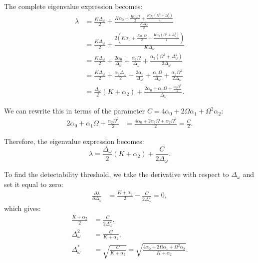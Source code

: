 \documentclass[a4paper,pre,superscriptaddress,floatfix,nofootinbib,twocolumn]{revtex4-1}
\begin{document}
The complete eigenvalue expression becomes:
\begin{align*}
\lambda &= \frac{K\Delta_\omega}{2} + \frac{K\alpha_0 + \frac{K\alpha_1 \Omega}{2} + \frac{K\alpha_2(\Omega^2 + \Delta_\omega^2)}{4}}{\frac{K\Delta_\omega}{2}}\\
&= \frac{K\Delta_\omega}{2} + \frac{2\left(K\alpha_0 + \frac{K\alpha_1 \Omega}{2} + \frac{K\alpha_2(\Omega^2 + \Delta_\omega^2)}{4}\right)}{K\Delta_\omega}\\
&= \frac{K\Delta_\omega}{2} + \frac{2\alpha_0}{\Delta_\omega} + \frac{\alpha_1 \Omega}{\Delta_\omega} + \frac{\alpha_2(\Omega^2 + \Delta_\omega^2)}{2\Delta_\omega}\\
&= \frac{K\Delta_\omega}{2} + \frac{\alpha_2\Delta_\omega}{2} + \frac{2\alpha_0}{\Delta_\omega} + \frac{\alpha_1 \Omega}{\Delta_\omega} + \frac{\alpha_2\Omega^2}{2\Delta_\omega}\\
&= \frac{\Delta_\omega}{2}(K + \alpha_2) + \frac{2\alpha_0 + \alpha_1 \Omega + \frac{\alpha_2\Omega^2}{2}}{\Delta_\omega}.
\end{align*}

We can rewrite this in terms of the parameter $C = 4\alpha_0 + 2\Omega\alpha_1 + \Omega^2\alpha_2$:
\begin{align*}
2\alpha_0 + \alpha_1 \Omega + \frac{\alpha_2\Omega^2}{2} &= \frac{4\alpha_0 + 2\alpha_1 \Omega + \alpha_2\Omega^2}{2} = \frac{C}{2}.
\end{align*}

Therefore, the eigenvalue expression becomes:
\begin{equation*}
\lambda = \frac{\Delta_\omega}{2}(K + \alpha_2) + \frac{C}{2\Delta_\omega}.
\end{equation*}

To find the detectability threshold, we take the derivative with respect to $\Delta_\omega$ and set it equal to zero:
\begin{align*}
\frac{\partial \lambda}{\partial \Delta_\omega} &= \frac{K + \alpha_2}{2} - \frac{C}{2\Delta_\omega^2} = 0,
\end{align*}
which gives:
\begin{align*}
\frac{K + \alpha_2}{2} &= \frac{C}{2\Delta_\omega^2},\\
\Delta_\omega^2 &= \frac{C}{K + \alpha_2},\\
\Delta_\omega^* &= \sqrt{\frac{C}{K + \alpha_2}} = \sqrt{\frac{4\alpha_0 + 2\Omega\alpha_1 + \Omega^2\alpha_2}{K + \alpha_2}}.
\end{align*}
\end{document}
